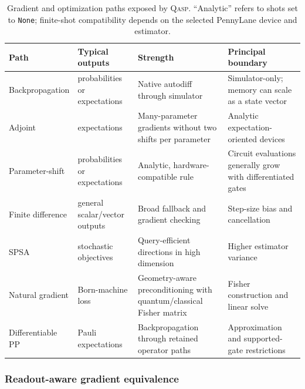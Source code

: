 \documentclass[10pt]{article}
\newcommand{\qasp}{\textsc{Qasp}}
\newcommand{\code}[1]{\texttt{#1}}
\begin{document}
\begin{table}[t]
\centering
\caption{Gradient and optimization paths exposed by \qasp{}.  ``Analytic'' refers to shots set to \code{None}; finite-shot compatibility depends on the selected PennyLane device and estimator.}
\label{tab:gradients}
\small
\begin{tabularx}{\textwidth}{@{}p{}p{}X p{}@{}}
\toprule
Path & Typical outputs & Strength & Principal boundary \\
\midrule
Backpropagation & probabilities or expectations & Native autodiff through simulator & Simulator-only; memory can scale as a state vector \\
Adjoint & expectations & Many-parameter gradients without two shifts per parameter & Analytic expectation-oriented devices \\
Parameter-shift & probabilities or expectations & Analytic, hardware-compatible rule & Circuit evaluations generally grow with differentiated gates \\
Finite difference & general scalar/vector outputs & Broad fallback and gradient checking & Step-size bias and cancellation \\
SPSA & stochastic objectives & Query-efficient directions in high dimension & Higher estimator variance \\
Natural gradient & Born-machine loss & Geometry-aware preconditioning with quantum/classical Fisher matrix & Fisher construction and linear solve \\
Differentiable PP & Pauli expectations & Backpropagation through retained operator paths & Approximation and supported-gate restrictions \\
\bottomrule
\end{tabularx}
\end{table}

\subsubsection{Readout-aware gradient equivalence}
\end{document}
